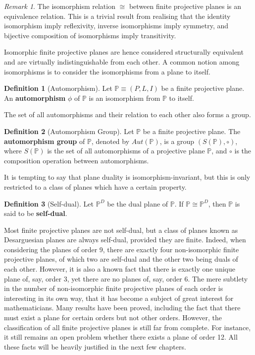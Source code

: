 \documentclass{report}
\renewcommand{\P}{\mathbb{P}}
\theoremstyle{definition}\newtheorem*{definition}{Definition}
\theoremstyle{definition}\newtheorem*{example}{Example}
\theoremstyle{remark}\newtheorem*{remark}{Remark}
\begin{document}
\begin{remark}
The isomorphism relation $ \cong $ between finite projective planes is an equivalence relation. This is a trivial result from realising that the identity isomorphism imply reflexivity, inverse isomorphisms imply symmetry, and bijective composition of isomorphisms imply transitivity.
\end{remark}

Isomorphic finite projective planes are hence considered structurally equivalent and are virtually indistinguishable from each other. A common notion among isomorphisms is to consider the isomorphisms from a plane to itself.

\begin{definition}[Automorphism]
Let $ \P \equiv (P, L, I) $ be a finite projective plane. An \textbf{automorphism} $ \phi $ of $ \P $ is an isomorphism from $ \P $ to itself.
\end{definition}

The set of all automorphisms and their relation to each other also forms a group.

\begin{definition}[Automorphism Group]
Let $ \P $ be a finite projective plane. The \textbf{automorphism group} of $ \P $, denoted by $ Aut(\P) $, is a group $ (S (\P), \circ) $, where $ S (\P) $ is the set of all automorphisms of a projective plane $ \P $, and $ \circ $ is the composition operation between automorphisms.
\end{definition}

It is tempting to say that plane duality is isomorphism-invariant, but this is only restricted to a class of planes which have a certain property.

\begin{definition}[Self-dual]
Let $ \P^D $ be the dual plane of $ \P $. If $ \P \cong \P^D $, then $ \P $ is said to be \textbf{self-dual}.
\end{definition}

Most finite projective planes are not self-dual, but a class of planes known as Desarguesian planes are always self-dual, provided they are finite. Indeed, when considering the planes of order 9, there are exactly four non-isomorphic finite projective planes, of which two are self-dual and the other two being duals of each other. However, it is also a known fact that there is exactly one unique plane of, say, order 3, yet there are no planes of, say, order 6. The mere subtlety in the number of non-isomorphic finite projective planes of each order is interesting in its own way, that it has become a subject of great interest for mathematicians. Many results have been proved, including the fact that there must exist a plane for certain orders but not other orders. However, the classification of all finite projective planes is still far from complete. For instance, it still remains an open problem whether there exists a plane of order 12. All these facts will be heavily justified in the next few chapters.
\end{document}
